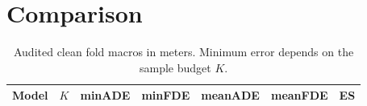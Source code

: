 \documentclass[10pt]{article}
\begin{document}
\section{Comparison}
\begin{table}[H]
\centering
\caption{Audited clean fold macros in meters. Minimum error depends on the sample budget \(K\).}
\label{tab:group-clean}
\small
\begin{tabular}{lrrrrrr}
\toprule
Model & \(K\) & minADE & minFDE & meanADE & meanFDE & ES \\
\midrule

\end{tabular}
\end{table}

\small

\end{document}
